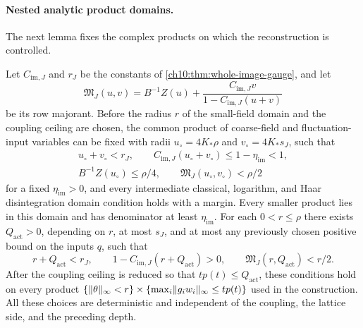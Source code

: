 \paragraph{Nested analytic product domains.}
The next lemma fixes the complex products on which the reconstruction is controlled.

\begin{lemma}\label{ch12:lem:product-reserves}
Let $C_{\mathrm{im},J}$ and $r_J$ be the constants of \cref{ch10:thm:whole-image-gauge}, and let
\[
 \mathfrak M_J(u,v)=B^{-1}Z(u)+\frac{C_{\mathrm{im},J}v}{1-C_{\mathrm{im},J}(u+v)}
\]
be its row majorant. Before the radius $r$ of the small-field domain and the coupling ceiling are chosen, the common product of coarse-field and fluctuation-input variables can be fixed with radii $u_\circ=4K_*\rho$ and $v_\circ=4K_*s_J$, such that
\begin{equation}
 \begin{gathered}
 u_\circ+v_\circ<r_J,\qquad
 C_{\mathrm{im},J}(u_\circ+v_\circ)\le1-\eta_{\mathrm{im}}<1,\\
 B^{-1}Z(u_\circ)\le\rho/4,\qquad
 \mathfrak M_J(u_\circ,v_\circ)<\rho/2
 \end{gathered}\label{ch12:eq:reserved-product-gates}
\end{equation}
for a fixed $\eta_{\mathrm{im}}>0$, and every intermediate classical, logarithm, and Haar disintegration domain condition holds with a margin. Every smaller product lies in this domain and has denominator at least $\eta_{\mathrm{im}}$. For each $0<r\le\rho$ there exists $Q_{\mathrm{act}}>0$, depending on $r$, at most $s_J$, and at most any previously chosen positive bound on the inputs $q$, such that
\begin{equation}
 r+Q_{\mathrm{act}}<r_J,\qquad
 1-C_{\mathrm{im},J}(r+Q_{\mathrm{act}})>0,\qquad
 \mathfrak M_J(r,Q_{\mathrm{act}})<r/2. \label{ch12:eq:actual-product-gates}
\end{equation}
After the coupling ceiling is reduced so that $tp(t)\le Q_{\mathrm{act}}$, these conditions hold on every product $\{\lVert \theta\rVert_\infty<r\}\times\{\max_i\lVert g_iw_i\rVert_\infty\le tp(t)\}$ used in the construction. All these choices are deterministic and independent of the coupling, the lattice side, and the preceding depth.
\end{lemma}

